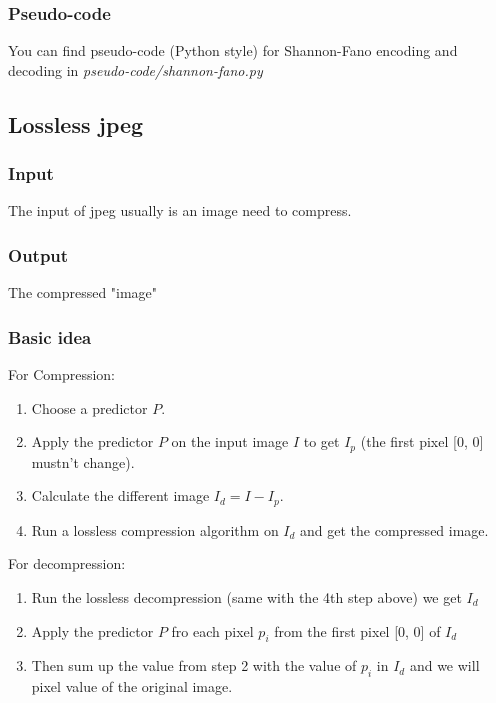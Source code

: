 \subsubsection*{Pseudo-code}
You can find pseudo-code (Python style) for Shannon-Fano encoding and decoding in \textit{pseudo-code/shannon-fano.py}

\subsection{Lossless jpeg}
\subsubsection*{Input}
The input of jpeg usually is an image need to compress.
\subsubsection*{Output}
The compressed "image"
\subsubsection*{Basic idea}
For Compression:
\begin{enumerate}
\item Choose a predictor $P$.
\item Apply the predictor $P$ on the input image $I$ to get $I_p$ (the first pixel [0, 0] mustn't change).
\item Calculate the different image $I_d = I - I_p$.
\item Run a lossless compression algorithm on $I_d$ and get the compressed image.
\end{enumerate}
For decompression:
\begin{enumerate}
\item Run the lossless decompression (same with the 4th step above) we get $I_d$
\item Apply the predictor $P$ fro each pixel $p_i$ from the first pixel [0, 0] of $I_d$
\item Then sum up the value from step 2 with the value of $p_i$ in $I_d$ and we will pixel value of the original image.
\end{enumerate}
